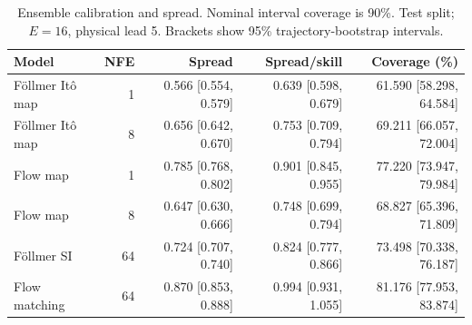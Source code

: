 \begin{table}[t]
\centering
\small
\setlength{\tabcolsep}{3pt}
\caption{Ensemble calibration and spread. Nominal interval coverage is 90\%. Test split; $E=16$, physical lead 5. Brackets show 95\% trajectory-bootstrap intervals.}
\label{tab:map-calibration}
\begin{tabular}{lrrrr}
\toprule
Model & NFE & Spread & Spread/skill & Coverage (\%) \\
\midrule
Föllmer Itô map & 1 & 0.566 [0.554, 0.579] & 0.639 [0.598, 0.679] & 61.590 [58.298, 64.584] \\
Föllmer Itô map & 8 & 0.656 [0.642, 0.670] & 0.753 [0.709, 0.794] & 69.211 [66.057, 72.004] \\
\addlinespace
Flow map & 1 & 0.785 [0.768, 0.802] & 0.901 [0.845, 0.955] & 77.220 [73.947, 79.984] \\
Flow map & 8 & 0.647 [0.630, 0.666] & 0.748 [0.699, 0.794] & 68.827 [65.396, 71.809] \\
\addlinespace
Föllmer SI & 64 & 0.724 [0.707, 0.740] & 0.824 [0.777, 0.866] & 73.498 [70.338, 76.187] \\
\addlinespace
Flow matching & 64 & 0.870 [0.853, 0.888] & 0.994 [0.931, 1.055] & 81.176 [77.953, 83.874] \\
\bottomrule
\end{tabular}
\end{table}
